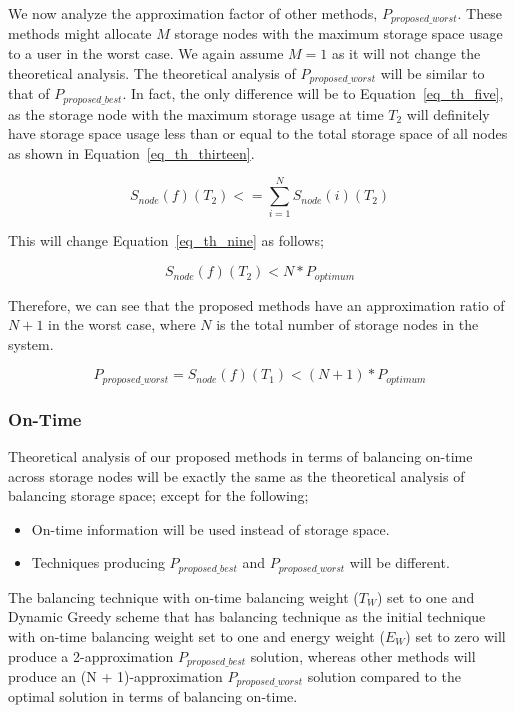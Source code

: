 \documentclass[preprint,12pt]{elsarticle}
\begin{document}
We now analyze the approximation factor of other methods, $P_{proposed\_worst}$. These methods
might allocate $M$ storage nodes with the maximum storage space usage to a user in the worst case. We again
assume $ M = 1 $ as it will not change the theoretical analysis. The theoretical analysis of $P_{proposed\_worst}$
will be similar to that of $P_{proposed\_best}$. In fact, the only difference will be to Equation~\eqref{eq_th_five},
as the storage node with the maximum storage usage at time $T_2$ will definitely have storage space usage less
than or equal to the total storage space of all nodes as shown in Equation~\eqref{eq_th_thirteen}.

\begin{equation}
S_{node}(f)(T_2) <= \sum\limits_{i=1}^{N}S_{node}(i)(T_2)
\label{eq_th_thirteen}
\end{equation}
\hfill

This will change Equation~\eqref{eq_th_nine} as follows;

\begin{equation}
S_{node}(f)(T_2) < N * P_{optimum}
\label{eq_th_fourteen}
\end{equation}
\hfill

Therefore, we can see that the proposed methods have an approximation ratio of $N + 1$ in the worst case, where
$N$ is the total number of storage nodes in the system.

\begin{equation}
P_{proposed\_worst} = S_{node}(f)(T_1) < (N + 1) * P_{optimum}
\label{eq_th_fifteen}
\end{equation}
\hfill

\subsubsection{On-Time}
Theoretical analysis of our proposed methods in terms of balancing on-time across storage
nodes will be exactly the same as the theoretical analysis of balancing storage space; except
for the following;

\begin{itemize}
\item On-time information will be used instead of storage space.
\item Techniques producing $P_{proposed\_best}$ and $P_{proposed\_worst}$
will be different.
\end{itemize}

The balancing technique with on-time balancing weight ($T_W$) set to one and Dynamic Greedy scheme
that has balancing technique as the initial technique with on-time balancing weight set to one
and energy weight ($E_W$) set to zero will produce a 2-approximation $P_{proposed\_best}$ solution,
whereas other methods will produce an (N + 1)-approximation $P_{proposed\_worst}$ solution
compared to the optimal solution in terms of balancing on-time.
\end{document}
